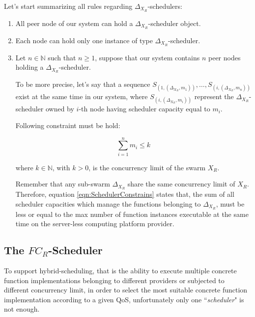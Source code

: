 \documentclass[10pt,a4paper]{article}
\begin{document}
Let's start summarizing all rules regarding $\Delta_{X_{R}}$-schedulers:

\begin{enumerate}

\item All peer node of our system can hold a $\Delta_{X_{R}}$-scheduler object.

\item Each node can hold only one instance of type $\Delta_{X_{R}}$-scheduler.

\item Let $n \in \mathbb{N}$ such that $n \geq 1$, suppose that our system contains $n$ peer nodes holding a $\Delta_{X_{R}}$-scheduler.

To be more precise, let's say that a sequence $S_{(1,(\Delta_{X_{R}},m_1))}, \ldots , S_{(i,(\Delta_{X_{R}},m_n))}$ exist at the same time in our system, where $S_{(i,(\Delta_{X_{R}},m_i))}$ represent the $\Delta_{X_{R}}$-scheduler owned by $i$-th node having scheduler capacity equal to $m_i$.

Following constraint must be hold:

\begin{equation}
\label{eqn:SchedulerConstrains}
\sum_{i=1}^{n} m_i \leq k
\end{equation}

where $k \in \mathbb{N}$, with $k > 0$, is the concurrency limit of the swarm $X_R$.

Remember that any sub-swarm $\Delta_{X_{R}}$ share the same concurrency limit of $X_R$. Therefore, equation \ref{eqn:SchedulerConstrains} states that, the sum of all scheduler capacities which manage the functions belonging to $\Delta_{X_{R}}$, must be less or equal to the max number of function instances executable at the same time on the server-less computing platform provider.

\end{enumerate}

\subsection{The $FC_R$-Scheduler}

To support hybrid-scheduling, that is the ability to execute multiple concrete function implementations belonging to different providers or subjected to different concurrency limit, in order to select the most suitable concrete function implementation according to a given QoS, unfortunately only one ``\textit{scheduler}" is not enough.
\end{document}
